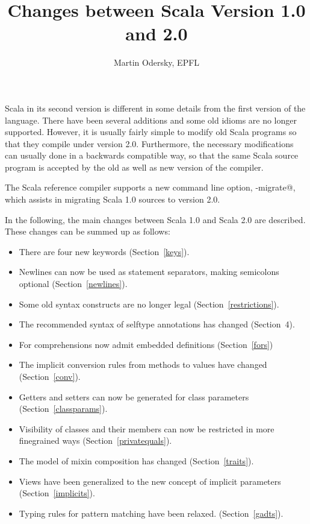 \documentclass[a4paper,11pt,twoside]{article}
\title{Changes between Scala Version 1.0 and 2.0}
\author{Martin Odersky, EPFL}
\begin{document}
\sloppy
\maketitle

Scala in its second version is different in some details from the
first version of the language. There have been several additions and
some old idioms are no longer supported. However, it is usually fairly
simple to modify old Scala programs so that they compile under version
2.0. Furthermore, the necessary modifications can usually done in a
backwards compatible way, so that the same Scala source program is
accepted by the old as well as new version of the compiler.

The Scala reference compiler supports a new command line option,
\lstinline@-migrate@, which assists in migrating Scala 1.0
sources to version 2.0.

In the following, the main changes between Scala 1.0 and Scala 2.0 are
described. These changes can be summed up as follows:
\begin{itemize}
\item
There are four new keywords (Section~\ref{keys}).
\item
Newlines can now be used as statement separators, making semicolons
optional (Section~\ref{newlines}).
\item 
Some old syntax constructs are no longer legal (Section~\ref{restrictions}).
\item
The recommended syntax of selftype annotations has changed
(Section~4).
\item 
For comprehensions now admit embedded definitions (Section~\ref{fors})
\item
The implicit conversion rules from methods to values have changed
(Section~\ref{conv}).
\item
Getters and setters can now be generated for class parameters
(Section~\ref{classparams}).
\item
Visibility of classes and their members can now be restricted in more
finegrained ways (Section~\ref{privatequals}).
\item
The model of mixin composition has changed (Section~\ref{traits}).
\item
Views have been generalized to the new concept of implicit parameters
(Section~\ref{implicits}).
\item
Typing rules for pattern matching have been relaxed. (Section~\ref{gadts}).
\end{itemize}
\end{document}
